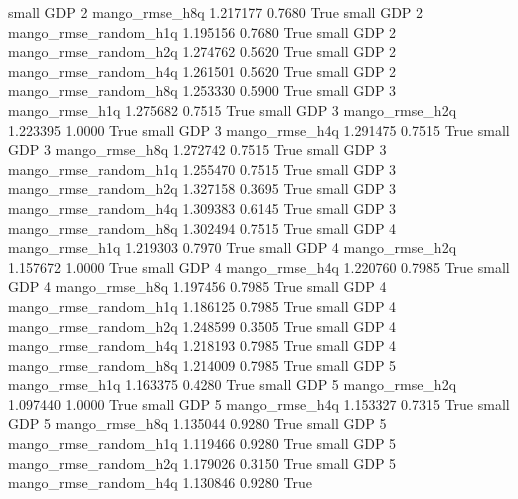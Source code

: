      small      GDP                 2        mango_rmse_h8q      1.217177      0.7680    True
     small      GDP                 2 mango_rmse_random_h1q      1.195156      0.7680    True
     small      GDP                 2 mango_rmse_random_h2q      1.274762      0.5620    True
     small      GDP                 2 mango_rmse_random_h4q      1.261501      0.5620    True
     small      GDP                 2 mango_rmse_random_h8q      1.253330      0.5900    True
     small      GDP                 3        mango_rmse_h1q      1.275682      0.7515    True
     small      GDP                 3        mango_rmse_h2q      1.223395      1.0000    True
     small      GDP                 3        mango_rmse_h4q      1.291475      0.7515    True
     small      GDP                 3        mango_rmse_h8q      1.272742      0.7515    True
     small      GDP                 3 mango_rmse_random_h1q      1.255470      0.7515    True
     small      GDP                 3 mango_rmse_random_h2q      1.327158      0.3695    True
     small      GDP                 3 mango_rmse_random_h4q      1.309383      0.6145    True
     small      GDP                 3 mango_rmse_random_h8q      1.302494      0.7515    True
     small      GDP                 4        mango_rmse_h1q      1.219303      0.7970    True
     small      GDP                 4        mango_rmse_h2q      1.157672      1.0000    True
     small      GDP                 4        mango_rmse_h4q      1.220760      0.7985    True
     small      GDP                 4        mango_rmse_h8q      1.197456      0.7985    True
     small      GDP                 4 mango_rmse_random_h1q      1.186125      0.7985    True
     small      GDP                 4 mango_rmse_random_h2q      1.248599      0.3505    True
     small      GDP                 4 mango_rmse_random_h4q      1.218193      0.7985    True
     small      GDP                 4 mango_rmse_random_h8q      1.214009      0.7985    True
     small      GDP                 5        mango_rmse_h1q      1.163375      0.4280    True
     small      GDP                 5        mango_rmse_h2q      1.097440      1.0000    True
     small      GDP                 5        mango_rmse_h4q      1.153327      0.7315    True
     small      GDP                 5        mango_rmse_h8q      1.135044      0.9280    True
     small      GDP                 5 mango_rmse_random_h1q      1.119466      0.9280    True
     small      GDP                 5 mango_rmse_random_h2q      1.179026      0.3150    True
     small      GDP                 5 mango_rmse_random_h4q      1.130846      0.9280    True
